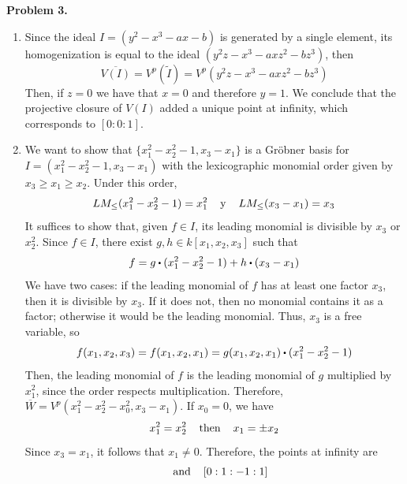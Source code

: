\documentclass{article}
\begin{document}
\vspace{5mm}
\noindent\textbf{Problem 3.}
\begin{enumerate}
    \item[(a)] Since the ideal $I=(y^{2}-x^{3}-ax-b)$ is generated by a single element, its 
    homogenization is equal to the ideal $(y^{2}z-x^{3}-axz^{2}-bz^{3})$, then
    \begin{equation*}
        \overline{V(I)}=V^{p}(\widetilde{I})=V^{p}(y^{2}z-x^{3}-axz^{2}-bz^{3})
    \end{equation*}
    Then, if $z=0$ we have that $x=0$ and therefore $y=1$. We conclude that the projective closure
    of $V(I)$ added a unique point at infinity, which corresponds to $[0:0:1]$.

    \item [(b)] We want to show that $\{x_{1}^{2}-x_{2}^{2}-1,x_{3}-x_{1}\}$ is a Gröbner basis 
    for $I=(x_{1}^{2}-x_{2}^{2}-1,x_{3}-x_{1})$ with the lexicographic monomial order given by
    $x_{3}\geq x_{1}\geq x_{2}$. Under this order,
    \begin{equation*}
        LM_{\leq}(x_{1}^{2}-x_{2}^{2}-1)=x_{1}^{2} \hspace{4mm}\text{y}\hspace{4mm}
        LM_{\leq}(x_{3}-x_{1})=x_{3}
    \end{equation*}
    It suffices to show that, given $f\in I$, its leading monomial is divisible by $x_{3}$ or
    $x_{2}^{2}$. Since $f\in I$, there exist $g,h\in k[x_{1},x_{2},x_{3}]$ such that
    \begin{equation*}
        f=g\sbullet(x_{1}^{2}-x_{2}^{2}-1)+h\sbullet(x_{3}-x_{1})
    \end{equation*}
    We have two cases: if the leading monomial of $f$ has at least one factor $x_{3}$, then it is
    divisible by $x_{3}$. If it does not, then no monomial contains it as a factor; otherwise it
    would be the leading monomial. Thus, $x_{3}$ is a free variable, so
    \begin{equation*}
        f(x_{1},x_{2},x_{3})
        =f(x_{1},x_{2},x_{1})=g(x_{1},x_{2},x_{1})\sbullet(x_{1}^{2}-x_{2}^{2}-1)
    \end{equation*}
    Then, the leading monomial of $f$ is the leading monomial of $g$ multiplied by $x_{1}^{2}$, 
    since the order respects multiplication. Therefore, 
    $\overline{W}=V^{p}(x_{1}^{2}-x_{2}^{2}-x_{0}^{2},x_{3}-x_{1})$. If $x_{0}=0$, we have
    \begin{equation*}
        x_{1}^{2}=x_{2}^{2} \hspace{4mm}\text{then}\hspace{4mm} x_{1}=\pm x_{2}
    \end{equation*}
    Since $x_{3}=x_{1}$, it follows that $x_{1}\neq0$. Therefore, the points at infinity are
    \begin{equation*}
        [0:1:1:1] \hhtext{and} [0:1:-1:1]
    \end{equation*}
\end{enumerate}
\end{document}
